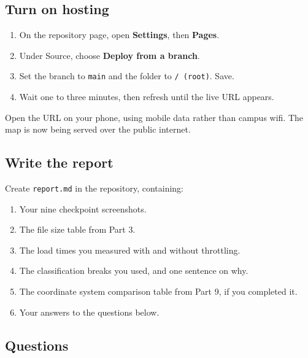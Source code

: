 \documentclass{article}
\newcommand{\cd}[1]{\texttt{#1}}
\begin{document}
\subsection{Turn on hosting}

\begin{enumerate}
  \item On the repository page, open \textbf{Settings}, then
        \textbf{Pages}.
  \item Under Source, choose \textbf{Deploy from a branch}.
  \item Set the branch to \cd{main} and the folder to \cd{/ (root)}.
        Save.
  \item Wait one to three minutes, then refresh until the live URL
        appears.
\end{enumerate}

Open the URL on your phone, using mobile data rather than campus wifi.
The map is now being served over the public internet.

\subsection{Write the report}

Create \cd{report.md} in the repository, containing:

\begin{enumerate}
  \item Your nine checkpoint screenshots.
  \item The file size table from Part 3.
  \item The load times you measured with and without throttling.
  \item The classification breaks you used, and one sentence on why.
  \item The coordinate system comparison table from Part 9, if you
        completed it.
  \item Your answers to the questions below.
\end{enumerate}

\subsection{Questions}
\end{document}
